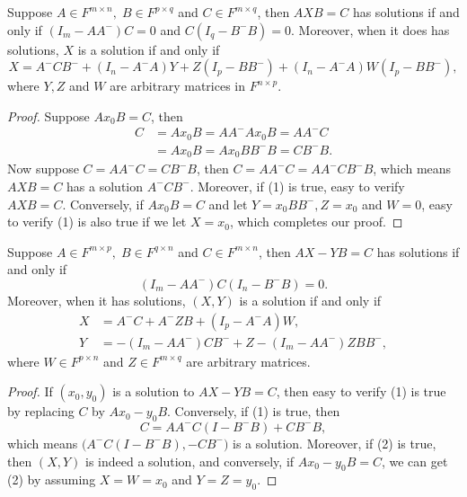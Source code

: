 \begin{pro}%
	Suppose $A\in F^{m\times n},\; B\in F^{p\times q}$ and $C\in F^{m\times q}$, then $AXB=C$ has solutions if and only if $(I_m-AA^-)C=0$ and $C(I_q-B^-B)=0$. Moreover, when it does has solutions, $X$ is a solution if and only if 
	\[X=A^-CB^-+(I_n-A^-A)Y+Z(I_p-BB^-)+(I_n-A^-A)W(I_p-BB^-),\tag{1}\]
	where $Y,Z$ and $W$ are arbitrary matrices in $F^{n\times p}$.
\end{pro}
\begin{proof}
	Suppose $Ax_0B=C$, then 
	\begin{align*}
		C&=Ax_0B=AA^- Ax_0B=AA^- C\\
		 &=Ax_0B=Ax_0BB^- B=CB^- B.
	\end{align*}
	Now suppose $C=AA^- C=CB^-B$, then $C=AA^-C=AA^-CB^-B$, which means $AXB=C$ has a solution $A^-CB^-$. Moreover, if (1) is true, easy to verify $AXB=C$. Conversely, if $Ax_0B=C$ and let $Y=x_0BB^-,Z=x_0$ and $W=0$, easy to verify (1) is also true if we let $X=x_0$, which completes our proof.
\end{proof}

\begin{pro}%
	Suppose $A\in F^{m\times p},\;B\in F^{q\times n}$ and $C\in F^{m\times n}$, then $AX-YB=C$ has solutions if and only if 
	\[(I_m-AA^-)C(I_n-B^-B)=0.\tag{1}\]
	Moreover, when it has solutions, $(X,Y)$ is a solution if and only if 
	\begin{align*}
		X&=A^- C+A^- ZB+(I_p-A^-A)W,\\
		Y&=-(I_m-AA^-)CB^-+Z-(I_m-AA^-)ZBB^-,\tag{2}
	\end{align*}
	where $W\in F^{p\times n}$ and $Z\in F^{m\times q}$ are arbitrary matrices.
\end{pro}
\begin{proof}
	If $(x_0,y_0)$ is a solution to $AX-YB=C$, then easy to verify (1) is true by replacing $C$ by $Ax_0-y_0B$. Conversely, if (1) is true, then \[C=AA^-C(I-B^-B)+CB^-B,\] which means $\big(A^-C(I-B^-B),-CB^-\big)$ is a solution. Moreover, if (2) is true, then $(X,Y)$ is indeed a solution, and conversely, if $Ax_0-y_0B=C$, we can get (2) by assuming $X=W=x_0$ and $Y=Z=y_0$.
\end{proof}
	
